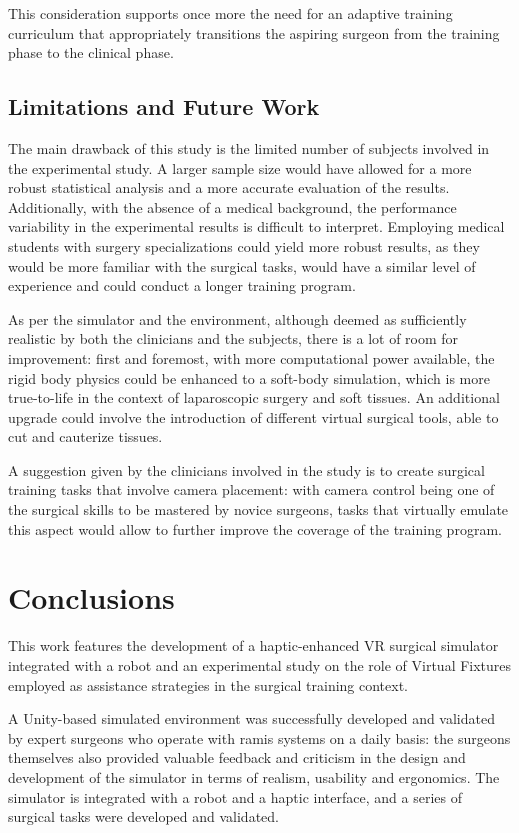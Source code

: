 \documentclass[../main.tex]{subfiles}
\begin{document}
This consideration supports once more the need for an adaptive training curriculum that appropriately transitions the aspiring surgeon from the training phase to the clinical phase.

\section{Limitations and Future Work}
The main drawback of this study is the limited number of subjects involved in the experimental study. A larger sample size would have allowed for a more robust statistical analysis and a more accurate evaluation of the results. Additionally, with the absence of a medical background, the performance variability in the experimental results is difficult to interpret. Employing medical students with surgery specializations could yield more robust results, as they would be more familiar with the surgical tasks, would have a similar level of experience and could conduct a longer training program.

As per the simulator and the \vr environment, although deemed as sufficiently realistic by both the clinicians and the subjects, there is a lot of room for improvement: first and foremost, with more computational power available, the rigid body physics could be enhanced to a soft-body simulation, which is more true-to-life in the context of laparoscopic surgery and soft tissues. An additional upgrade could involve the introduction of different virtual surgical tools, able to cut and cauterize tissues.

A suggestion given by the clinicians involved in the study is to create surgical training tasks that involve camera placement: with camera control being one of the surgical skills to be mastered by novice surgeons, tasks that virtually emulate this aspect would allow to further improve the coverage of the training program.  

\chapter{Conclusions}
This work features the development of a haptic-enhanced VR surgical simulator integrated with a \davinci robot and an experimental study on the role of Virtual Fixtures employed as assistance strategies in the surgical training context.

A Unity-based simulated environment was successfully developed and validated by expert surgeons who operate with \ac{ramis} systems on a daily basis: the surgeons themselves also provided valuable feedback and criticism in the design and development of the simulator in terms of realism, usability and ergonomics. The simulator is integrated with a \davinci robot and a haptic interface, and a series of surgical tasks were developed and validated.
\end{document}

